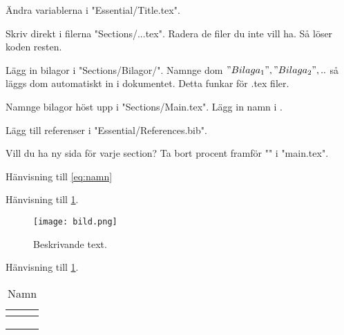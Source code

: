 
Ändra variablerna i "Essential/Title.tex".

Skriv direkt i filerna "Sections/...tex".
Radera de filer du inte vill ha. Så löser koden resten.

Lägg in bilagor i "Sections/Bilagor/".
Namnge dom $"Bilaga_1", "Bilaga_2",..$ så läggs dom automatiskt in i dokumentet.
Detta funkar för .tex filer.

Namnge bilagor höst upp i "Sections/Main.tex".
Lägg in namn i \edef\bilaganamn{{"namn 1","namn 2",""}}. 

Lägg till referenser i "Essential/References.bib".

Vill du ha ny sida för varje section? Ta bort procent framför "\newpage" i "main.tex".



Hänvisning till \cref{eq:namn}
\begin{equation} \label{eq:namn}
\end{equation}


Hänvisning till \cref{fig:namn}.
\begin{figure} [H]
    \centering 
    \texttt{[image: bild.png]}
    \caption{Beskrivande text.}
    \label{fig:namn}
\end{figure}


Hänvisning till \cref{tab:namn}.
\begin{table}[H]
\centering
\caption{Namn} \label{tab:namn}
\begin{tabular}{ l l l } \toprule
\textbf{} & \textbf{} & \textbf{} \\
\midrule
     &  &  \\
     &  &  \\
     &  &  \\
\bottomrule
\end{tabular}
\end{table}


